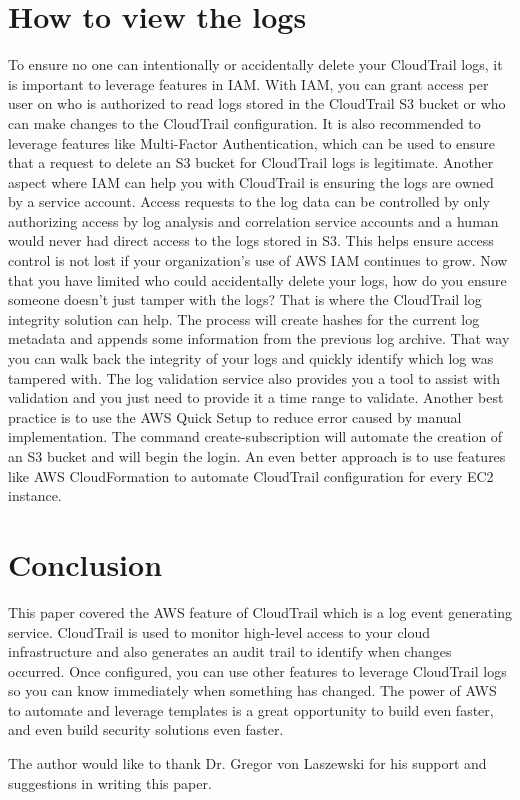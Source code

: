 \section{How to view the logs}

To ensure no one can intentionally or accidentally delete your CloudTrail logs, it is important to leverage features in IAM. With IAM, you can grant access per user on who is authorized to read logs stored in the CloudTrail S3 bucket or who can make changes to the CloudTrail configuration. It is also recommended to leverage features like Multi-Factor Authentication, which can be used to ensure that a request to delete an S3 bucket for CloudTrail logs is legitimate. 
Another aspect where IAM can help you with CloudTrail is ensuring the logs are owned by a service account. Access requests to the log data can be controlled by only authorizing access by log analysis and correlation service accounts and a human would never had direct access to the logs stored in S3. This helps ensure access control is not lost if your organization’s use of AWS IAM continues to grow. 
Now that you have limited who could accidentally delete your logs, how do you ensure someone doesn’t just tamper with the logs? That is where the CloudTrail log integrity solution can help. The process will create hashes for the current log metadata and appends some information from the previous log archive. That way you can walk back the integrity of your logs and quickly identify which log was tampered with. The log validation service also provides you a tool to assist with validation and you just need to provide it a time range to validate.
Another best practice is to use the AWS Quick Setup to reduce error caused by manual implementation. The command create-subscription will automate the creation of an S3 bucket and will begin the login. An even better approach is to use features like AWS CloudFormation to automate CloudTrail configuration for every EC2 instance.

\section{Conclusion}

This paper covered the AWS feature of CloudTrail which is a log event generating service. CloudTrail is used to monitor high-level access to your cloud infrastructure and also generates an audit trail to identify when changes occurred. Once configured, you can use other features to leverage CloudTrail logs so you can know immediately when something has changed. The power of AWS to automate and leverage templates is a great opportunity to build even faster, and even build security solutions even faster.


\begin{acks}

The author would like to thank Dr. Gregor von Laszewski for his support and suggestions in writing this paper.

\end{acks}


 

